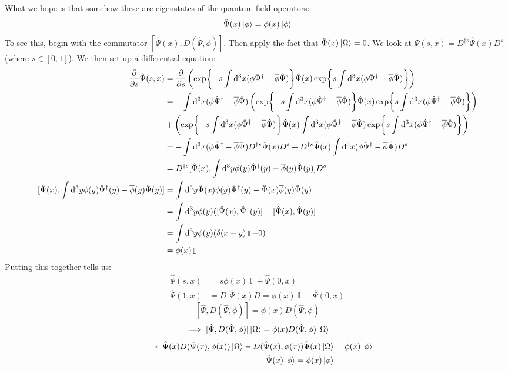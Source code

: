 \documentclass{article}
\DeclareMathOperator{\II}{\mathbb{I}}
\begin{document}
What we hope is that somehow these are eigenstates of the quantum field operators:
\begin{equation}
\hat\Psi(x)\ket{\phi} = \phi(x) \ket{\phi}
\end{equation}
To see this, begin with the commutator $[\hat\Psi(x),D(\hat\Psi,\phi)]$. Then apply the fact that $\hat\Psi(x)\ket{\Omega}=0$. We look at $\hat\Psi(s,x) = D^{\dagger s}\hat \Psi(x)D^s$ (where $s \in [0,1]$). We then set up a differential equation:
\begin{align*}
\pdv{s}\hat\Psi(s,x) &= \pdv{s}\left(\exp{-s\int \dd^3 x (\phi\hat\Psi^\dagger-\overline\phi\hat\Psi)} \hat\Psi(x) \exp{s\int \dd^3 x (\phi\hat\Psi^\dagger-\overline\phi\hat\Psi)}\right)\\
&= -\int \dd^3 x (\phi\hat\Psi^\dagger-\overline\phi\hat\Psi) \left(\exp{-s\int \dd^3 x (\phi\hat\Psi^\dagger-\overline\phi\hat\Psi)} \hat\Psi(x) \exp{s\int \dd^3 x (\phi\hat\Psi^\dagger-\overline\phi\hat\Psi)}\right)\\
&+\left(\exp{-s\int \dd^3 x (\phi\hat\Psi^\dagger-\overline\phi\hat\Psi)}\hat\Psi(x)  \int \dd^3 x (\phi\hat\Psi^\dagger-\overline\phi\hat\Psi) \exp{s\int \dd^3 x (\phi\hat\Psi^\dagger-\overline\phi\hat\Psi)}\right)\\
&= -\int \dd^3 x (\phi\hat\Psi^\dagger-\overline\phi\hat\Psi) D^{\dagger s} \hat\Psi(x)D^s+ D^{\dagger s}\hat\Psi(x)\int \dd^3 x (\phi\hat\Psi^\dagger-\overline\phi\hat\Psi)D^s\\
&= D^{\dagger s} [\hat\Psi(x),\int \dd^3 y \phi(y)\hat\Psi^\dagger(y)-\overline\phi(y)\hat\Psi(y)]D^s\\
[\hat\Psi(x),\int \dd^3 y \phi(y)\hat\Psi^\dagger(y)-\overline\phi(y)\hat\Psi(y)] &= \int \dd^3 y \hat\Psi(x)\phi(y)\hat\Psi^\dagger(y)-\hat\Psi(x)\overline\phi(y)\hat\Psi(y)\\
&= \int\dd^3 y \phi(y)([\hat\Psi(x),\hat\Psi^\dagger(y)]-[\hat\Psi(x),\hat\Psi(y)]\\
&= \int \dd^3 y \phi(y)(\delta(x-y)\II-0)\\
&= \phi(x)\II
\end{align*}
Putting this together tells us:
\begin{align}
\hat\Psi(s,x)&=s\phi(x)\II+\hat\Psi(0,x)\\
\hat\Psi(1,x)&=D^\dagger \hat\Psi(x) D = \phi(x)\II+\hat\Psi(0,x)
\end{align}
\[[\hat\Psi,D(\hat\Psi,\phi)] = \phi(x)D(\hat\Psi,\phi)\]
\[\implies [\hat\Psi,D(\hat\Psi,\phi)]\ket{\Omega} = \phi(x)D(\hat\Psi,\phi)\ket{\Omega}\]
\begin{align}
\implies \hat\Psi(x) D(\hat\Psi(x),\phi(x))\ket{\Omega} - D(\hat\Psi(x),\phi(x))\hat\Psi(x)\ket{\Omega} &= \phi(x)\ket{\phi}\\
\hat\Psi(x)\ket{\phi}=\phi(x)\ket{\phi}
\end{align}
\end{document}
